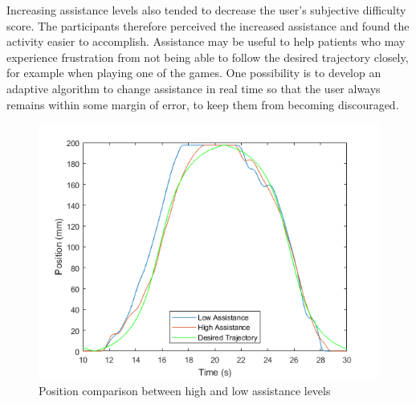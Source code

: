\documentclass[12pt]{report}
\begin{document}
	Increasing assistance levels also tended to decrease the user's subjective difficulty score. The participants therefore perceived the increased assistance and found the activity easier to accomplish. Assistance may be useful to help patients who may experience frustration from not being able to follow the desired trajectory closely, for example when playing one of the games. One possibility is to develop an adaptive algorithm to change assistance in real time so that the user always remains within some margin of error, to keep them from becoming discouraged. 
 
	
	
	


	


\begin{figure}[h] 
	\centering
	\includegraphics[width=0.9\linewidth]{position_comp}
	\caption{Position comparison between high and low assistance levels}
	\label{fig:pos_comp}
\end{figure}
		
\end{document}
